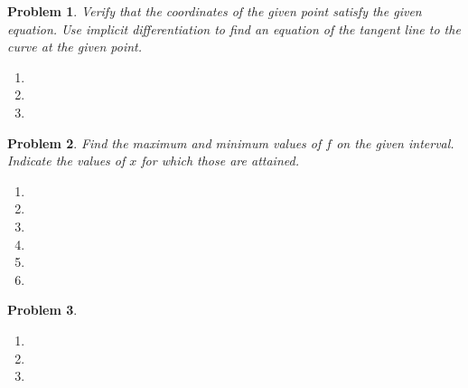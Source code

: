 \documentclass{article}
\renewcommand{\fcProblemRef}{\theproblem.\theenumi}
\newtheorem{problem}{Problem}
\begin{document}
\begin{problem}Verify that the coordinates of the given point satisfy the given equation. Use implicit differentiation to find an equation of the tangent line to the curve at the given point.

\begin{enumerate}[ref={\fcProblemRef}]
\item 
\item 
\item


\end{enumerate}
\end{problem}

\begin{problem}
Find the maximum and minimum values of $f$ on the given interval. Indicate the values of $x$ for which those are attained.
\begin{enumerate}[ref={\fcProblemRef}]
\item 
\item 
\item 
\item 
\item 
\item 
\end{enumerate}
\end{problem}

\begin{problem}~
\begin{enumerate}[ref={\fcProblemRef}]
\item 
\item 
\item 
\end{enumerate}
\end{problem}

\end{document}
